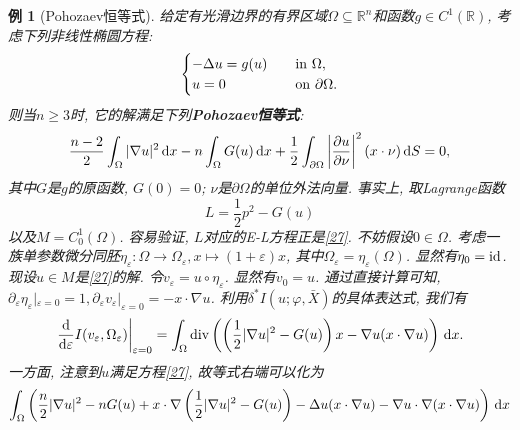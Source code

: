 \documentclass[12pt,a4paper]{article}
\newtheorem{example}[theorem]{例}
\begin{document}
\begin{example}[Pohozaev恒等式]
    给定有光滑边界的有界区域$\Omega \subseteq \mathbb{R}^n$和函数$g \in C^1(\mathbb{R})$, 考虑下列非线性椭圆方程:
    \begin{equation}\label{27}
        \begin{cases} 
            -\Delta u = g(u) \quad &{\rm in}\ \Omega, \\  
            u = 0 \quad &{\rm on}\ \partial\Omega. 
        \end{cases} 
    \end{equation}
    则当$n \geq 3$时, 它的解满足下列\textbf{Pohozaev恒等式}:
    \begin{equation*}
        \frac{n - 2}{2}\int_{\Omega}|\nabla u|^2 \,{\rm d}x - n\int_{\Omega}G(u) \,{\rm d}x + \frac{1}{2}\int_{\partial\Omega}\left|\frac{\partial u}{\partial\nu}\right|^2(x \cdot \nu) \,{\rm d}S = 0, 
    \end{equation*}
    其中$G$是$g$的原函数, $G(0) = 0$; $\nu$是$\partial\Omega$的单位外法向量. 事实上, 取Lagrange函数 
    \begin{equation*}
        L = \frac{1}{2}p^2 - G(u)
    \end{equation*}
    以及$M = C_0^1(\Omega)$. 容易验证, $L$对应的E-L方程正是\eqref{27}. 不妨假设$0 \in \Omega$. 
    考虑一族单参数微分同胚$\eta_{\varepsilon}\colon \Omega \rightarrow \Omega_{\varepsilon}, x \mapsto (1 + \varepsilon)x$, 其中$\Omega_{\varepsilon} = \eta_{\varepsilon}(\Omega)$. 显然有$\eta_0 = {\rm id}$.
    现设$u \in M$是\eqref{27}的解. 令$v_{\varepsilon} = u \circ \eta_{\varepsilon}$. 显然有$v_0 = u$.
    通过直接计算可知, $\partial_{\varepsilon}\eta_{\varepsilon}|_{\varepsilon = 0} = 1, \partial_{\varepsilon}v_{\varepsilon}|_{\varepsilon = 0} = -x \cdot \nabla u$.
    利用$\delta^*I(u; \varphi, \bar{X})$的具体表达式, 我们有 
    \begin{equation*}
        \left.\frac{{\rm d}}{{\rm d}\varepsilon}I(v_{\varepsilon}, \Omega_{\varepsilon})\right|_{\varepsilon = 0} = \int_{\Omega}{\rm div}\left(\left(\frac{1}{2}|\nabla u|^2 - G(u)\right)x - \nabla u(x \cdot \nabla u)\right) \,{\rm d}x.
    \end{equation*}
    一方面, 注意到$u$满足方程\eqref{27}, 故等式右端可以化为
    \begin{equation}\label{28}
        \begin{aligned}
            \int_{\Omega}&\left(\frac{n}{2}|\nabla u|^2 - nG(u) + x \cdot \nabla\left(\frac{1}{2}|\nabla u|^2 -G(u)\right) - \Delta u(x \cdot \nabla u) - \nabla u \cdot \nabla(x \cdot \nabla u)\right) \,{\rm d}x \\ 

\end{aligned}
\end{equation}
\end{example}
\end{document}
